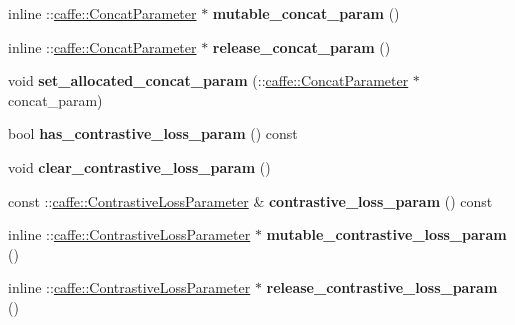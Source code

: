 \begin{DoxyCompactItemize}
inline \+::\mbox{\hyperlink{classcaffe_1_1_concat_parameter}{caffe\+::\+Concat\+Parameter}} $\ast$ {\bfseries mutable\+\_\+concat\+\_\+param} ()
\item 
\mbox{\label{classcaffe_1_1_v1_layer_parameter_aaedec179a40b9cd54f90c8a2c5799a54}} 
inline \+::\mbox{\hyperlink{classcaffe_1_1_concat_parameter}{caffe\+::\+Concat\+Parameter}} $\ast$ {\bfseries release\+\_\+concat\+\_\+param} ()
\item 
\mbox{\label{classcaffe_1_1_v1_layer_parameter_a29da037744a5e6fa6a9182852cb26b41}} 
void {\bfseries set\+\_\+allocated\+\_\+concat\+\_\+param} (\+::\mbox{\hyperlink{classcaffe_1_1_concat_parameter}{caffe\+::\+Concat\+Parameter}} $\ast$concat\+\_\+param)
\item 
\mbox{\label{classcaffe_1_1_v1_layer_parameter_ae1e9997fdfc1d13bdbf3bae330f548fd}} 
bool {\bfseries has\+\_\+contrastive\+\_\+loss\+\_\+param} () const
\item 
\mbox{\label{classcaffe_1_1_v1_layer_parameter_aefa52103cb318947f9d8688e1c2b0756}} 
void {\bfseries clear\+\_\+contrastive\+\_\+loss\+\_\+param} ()
\item 
\mbox{\label{classcaffe_1_1_v1_layer_parameter_a05b3b8160850fb9e5dfe2c1a74bfd8a1}} 
const \+::\mbox{\hyperlink{classcaffe_1_1_contrastive_loss_parameter}{caffe\+::\+Contrastive\+Loss\+Parameter}} \& {\bfseries contrastive\+\_\+loss\+\_\+param} () const
\item 
\mbox{\label{classcaffe_1_1_v1_layer_parameter_ace4a0efb8425c8cfb36c379f3092d578}} 
inline \+::\mbox{\hyperlink{classcaffe_1_1_contrastive_loss_parameter}{caffe\+::\+Contrastive\+Loss\+Parameter}} $\ast$ {\bfseries mutable\+\_\+contrastive\+\_\+loss\+\_\+param} ()
\item 
\mbox{\label{classcaffe_1_1_v1_layer_parameter_a83fb0bd20d12d029d455b2cd5097bda2}} 
inline \+::\mbox{\hyperlink{classcaffe_1_1_contrastive_loss_parameter}{caffe\+::\+Contrastive\+Loss\+Parameter}} $\ast$ {\bfseries release\+\_\+contrastive\+\_\+loss\+\_\+param} ()

\end{DoxyCompactItemize}
